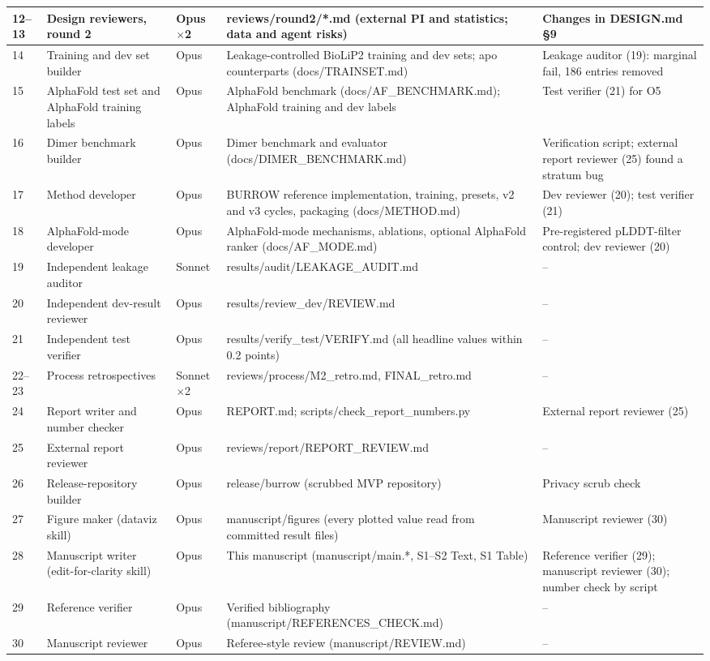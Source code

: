 \documentclass[10pt,letterpaper]{article}
\begin{document}
{\begin{tabular}{p{0.6cm}p{3.0cm}p{1.3cm}p{5.0cm}p{4.0cm}}
12--13 & Design reviewers, round 2 & Opus $\times$2 & reviews/round2/*.md (external PI and statistics; data and agent risks) & Changes in DESIGN.md §9 \\ \hline
14 & Training and dev set builder & Opus & Leakage-controlled BioLiP2 training and dev sets; apo counterparts (docs/TRAINSET.md) & Leakage auditor (19): marginal fail, 186 entries removed \\ \hline
15 & AlphaFold test set and AlphaFold training labels & Opus & AlphaFold benchmark (docs/AF\_BENCHMARK.md); AlphaFold training and dev labels & Test verifier (21) for O5 \\ \hline
16 & Dimer benchmark builder & Opus & Dimer benchmark and evaluator (docs/DIMER\_BENCHMARK.md) & Verification script; external report reviewer (25) found a stratum bug \\ \hline
17 & Method developer & Opus & BURROW reference implementation, training, presets, v2 and v3 cycles, packaging (docs/METHOD.md) & Dev reviewer (20); test verifier (21) \\ \hline
18 & AlphaFold-mode developer & Opus & AlphaFold-mode mechanisms, ablations, optional AlphaFold ranker (docs/AF\_MODE.md) & Pre-registered pLDDT-filter control; dev reviewer (20) \\ \hline
19 & Independent leakage auditor & Sonnet & results/audit/LEAKAGE\_AUDIT.md & -- \\ \hline
20 & Independent dev-result reviewer & Opus & results/review\_dev/REVIEW.md & -- \\ \hline
21 & Independent test verifier & Opus & results/verify\_test/VERIFY.md (all headline values within 0.2 points) & -- \\ \hline
22--23 & Process retrospectives & Sonnet $\times$2 & reviews/process/M2\_retro.md, FINAL\_retro.md & -- \\ \hline
24 & Report writer and number checker & Opus & REPORT.md; scripts/check\_report\_numbers.py & External report reviewer (25) \\ \hline
25 & External report reviewer & Opus & reviews/report/REPORT\_REVIEW.md & -- \\ \hline
26 & Release-repository builder & Opus & release/burrow (scrubbed MVP repository) & Privacy scrub check \\ \hline
27 & Figure maker (dataviz skill) & Opus & manuscript/figures (every plotted value read from committed result files) & Manuscript reviewer (30) \\ \hline
28 & Manuscript writer (edit-for-clarity skill) & Opus & This manuscript (manuscript/main.*, S1--S2 Text, S1 Table) & Reference verifier (29); manuscript reviewer (30); number check by script \\ \hline
29 & Reference verifier & Opus & Verified bibliography (manuscript/REFERENCES\_CHECK.md) & -- \\ \hline
30 & Manuscript reviewer & Opus & Referee-style review (manuscript/REVIEW.md) & -- \\ \hline
\end{tabular}}
\end{document}
